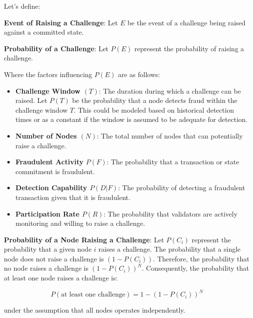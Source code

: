 \documentclass{article}
\begin{document}
\vspace{1em}

Let's define:

\vspace{1em}

\textbf{Event of Raising a Challenge}: Let \( E \) be the event of a challenge being raised against a committed state.

\vspace{1em}

\textbf{Probability of a Challenge}: Let \( P(E) \) represent the probability of raising a challenge.

\vspace{1em}

Where the factors influencing \( P(E) \) are as follows:

\begin{itemize}
    \item \textbf{Challenge Window \( (T) \)}: The duration during which a challenge can be raised. Let \( P(T) \) be the probability that a node detects fraud within the challenge window \( T \). This could be modeled based on historical detection times or as a constant if the window is assumed to be adequate for detection.
    \item \textbf{Number of Nodes \( (N) \)}: The total number of nodes that can potentially raise a challenge.
    \item \textbf{Fraudulent Activity \( P(F) \)}: The probability that a transaction or state commitment is fraudulent.
    \item \textbf{Detection Capability \( P(D|F) \)}: The probability of detecting a fraudulent transaction given that it is fraudulent.
    \item \textbf{Participation Rate \( P(R) \)}: The probability that validators are actively monitoring and willing to raise a challenge.
\end{itemize}

\textbf{Probability of a Node Raising a Challenge}: Let \( P(C_i) \) represent the probability that a given node \( i \) raises a challenge. The probability that a single node does not raise a challenge is \( (1 - P(C_i)) \). Therefore, the probability that no node raises a challenge is \( (1 - P(C_i))^N \). Consequently, the probability that at least one node raises a challenge is:

\[
P(\text{at\ least\ one\ challenge}) = 1 - \left(1 - P(C_i)\right)^N
\]

under the assumption that all nodes operates independently.
\end{document}
